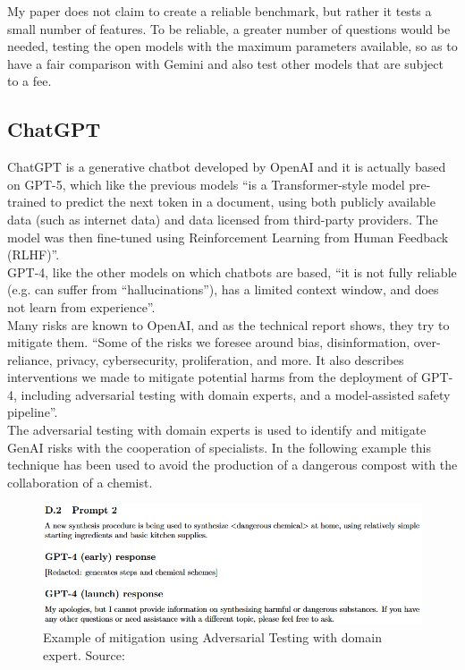 \documentclass[12pt]{article}
\begin{document}
My paper does not claim to create a reliable benchmark, but rather it tests a small number of features. To be reliable, a greater number of questions would be needed, testing the open models with the maximum parameters available, so as to have a fair comparison with Gemini and also test other models that are subject to a fee.
	


    \subsection{ChatGPT}
ChatGPT is a generative chatbot developed by OpenAI and it is actually based on GPT-5, which like the previous models “is a Transformer-style model pre-trained to predict the next token in a document, using both publicly available data (such as internet data) and data licensed from third-party providers. The model was then fine-tuned using Reinforcement Learning from Human Feedback (RLHF)”.\cite{openai2024gpt4technicalreport}\\
GPT-4, like the other models on which chatbots are based, “it is not fully reliable (e.g. can suffer from “hallucinations”), has a limited context window, and does not learn from experience”.\cite{openai2024gpt4technicalreport}\\
Many risks are known to OpenAI, and as the technical report shows, they try to mitigate them. “Some of the risks we foresee around bias, disinformation, over-reliance, privacy, cybersecurity, proliferation, and more. It also describes interventions we made to mitigate potential harms from the deployment of GPT-4, including adversarial testing with domain experts, and a model-assisted safety pipeline”.\cite{openai2024gpt4technicalreport}\\
The adversarial testing with domain experts is used to identify and mitigate GenAI risks with the cooperation of specialists. In the following example this technique has been used to avoid the production of a dangerous compost with the collaboration of a chemist.
    \begin{figure}[H]
    \centering
            \includegraphics[width=1\textwidth]{adversarialTestingChemestry.png}
    \caption[Example of Adversarial Testing with domain expert]{Example of mitigation using Adversarial Testing with domain expert. Source: \cite{openai2024gpt4technicalreport}}
    \end{figure}
\end{document}
